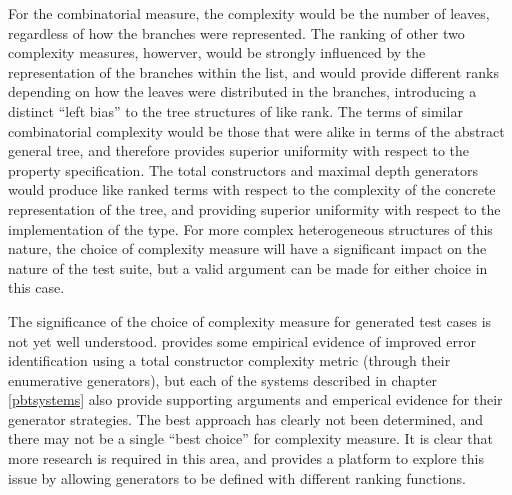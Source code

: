 For the combinatorial measure,
the complexity would be the number of leaves, 
regardless of how the branches were represented.
The ranking of other two complexity measures, howerver,
would be strongly influenced by the representation of the branches within the list,
and would provide different ranks depending on how the leaves were distributed in the branches,
introducing a distinct ``left bias'' to the tree structures of like rank.
The terms of similar combinatorial complexity would be those
that were alike in terms of the abstract general tree,
and therefore provides superior uniformity with respect to the property specification.
The total constructors and maximal depth generators would
produce like ranked terms with respect to the complexity of the concrete representation of the tree,
and providing superior uniformity with respect to the implementation of the type.
For more complex heterogeneous structures of this nature,
the choice of complexity measure will have a significant impact on the nature of the test suite,
but a valid argument can be made for either choice in this case.

The significance of the choice of complexity measure for generated test cases is not yet well understood.
\cite{Duregard2012} provides some empirical evidence of improved error identification
using a total constructor complexity metric (through their enumerative generators),
but each of the \pbt systems described in chapter \ref{pbtsystems}
also provide supporting arguments and emperical evidence for their generator strategies.
The best approach has clearly not been determined, 
and there may not be a single ``best choice'' for complexity measure.
It is clear that more research is required in this area,
and \GC provides a platform to explore this issue by allowing
generators to be defined with different ranking functions.





